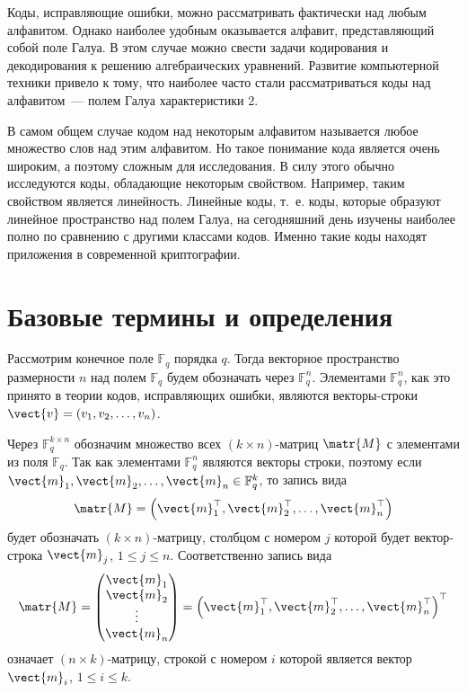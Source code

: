 \documentclass[12pt]{extreport}
\begin{document}
Коды, исправляющие ошибки, можно рассматривать фактически над любым алфавитом.
Однако наиболее удобным оказывается алфавит, представляющий собой поле Галуа.
В этом случае можно свести задачи кодирования и декодирования к решению алгебраических уравнений.
Развитие компьютерной техники привело к тому, что наиболее часто стали рассматриваться коды над алфавитом~--- полем Галуа характеристики \(2\).

В самом общем случае кодом над некоторым алфавитом называется любое множество слов над этим алфавитом.
Но такое понимание кода является очень широким, а поэтому сложным для исследования.
В силу этого обычно исследуются коды, обладающие некоторым свойством.
Например, таким свойством является линейность.
Линейные коды, т.~е. коды, которые образуют линейное пространство над полем Галуа, на сегодняшний день изучены наиболее полно по сравнению с другими классами кодов.
Именно такие коды находят приложения в современной криптографии.
\section{Базовые термины и определения}
\label{sec:orgac2574a}
Рассмотрим конечное поле \(\mathbb{F}_q\) порядка \(q\).
Тогда векторное пространство размерности \(n\) над полем \(\mathbb{F}_q\) будем обозначать через \(\mathbb{F}^n_q\).
Элементами \(\mathbb{F}^{n}_{q}\), как это принято в теории кодов, исправляющих ошибки, являются векторы-строки \(\vect{v} = \left(v_{1}, v_{2}, \dotsc, v_{n}\right)\).

Через \(\mathbb{F}^{k \times n}_{q}\) обозначим множество всех \((k \times n)\)-матриц \(\matr{M}\) с элементами из поля \(\mathbb{F}_{q}\).
Так как элементами \(\mathbb{F}^{n}_{q}\) являются векторы строки, поэтому если \(\vect{m}_1, \vect{m}_2, \dotsc ,\vect{m}_{n}\in \mathbb{F}^{k}_{q}\), то запись вида
\[ \matr{M}=\left(\vect{m}^{\top}_{1}, \vect{m}^{\top}_{2}, \dotsc, \vect{m}^{\top}_{n}\right) \]
будет обозначать \((k \times n)\)-матрицу, столбцом с номером \(j\) которой будет вектор-строка \(\vect{m}_j\), \(1\le j\le n\).
Соответственно запись вида
\[ \matr{M}= \begin{pmatrix}
             \vect{m}_{1}\\
             \vect{m}_{2}\\
             \vdots\\
             \vect{m}_{n}
             \end{pmatrix} = \left(\vect{m}^{\top}_{1}, \vect{m}^{\top}_{2}, \dotsc, \vect{m}^{\top}_{n}\right)^{\top} \]
означает \((n \times k)\)-матрицу, строкой с номером \(i\) которой является вектор \(\vect{m}_i\), \(1\le i\le k\).
\end{document}
